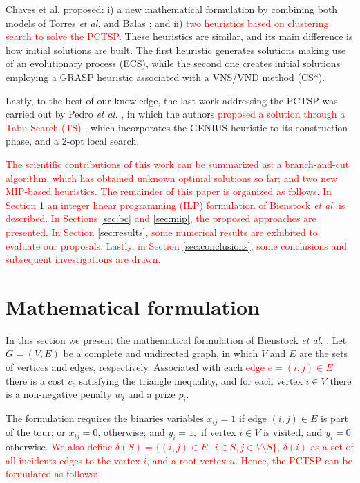\documentclass{ro}
\begin{document}
Chaves et al. \cite{chaves2005hybrid} proposed: i) a new mathematical formulation by combining both models of  Torres \textit{et al.} \cite{torres2003problemas} and Balas \cite{Balas89}; and ii)  \textcolor{red}{two heuristics   based on clustering search to solve the PCTSP}. These heuristics are  similar, and its main difference is how initial solutions are built. The first heuristic generates solutions making use of an evolutionary process (ECS), while the second one creates initial solutions employing a GRASP heuristic associated with a VNS/VND \cite{mladenovic12} method (CS*). 

Lastly, to the best of our knowledge, the last work addressing the PCTSP was carried out by Pedro \textit{et al.} \cite{pedro2013tabu}, in which the authors \textcolor{red}{proposed a solution through a Tabu Search (TS) \cite{laguna2018tabu}}, which incorporates the GENIUS \cite{genius} heuristic to its construction phase, and a 2-opt local search.

\textcolor{red}{
The  scientific contributions of this work can be summarized as: a branch-and-cut algorithm, which has obtained unknown optimal solutions so far; and two new MIP-based heuristics. The remainder of this paper is organized as follows. In Section \ref{sec:mf} an integer linear programming (ILP) formulation of Bienstock \textit{et al.}\cite{bienstock1993note} is described. In Sections \ref{sec:bc} and \ref{sec:mip}, the proposed approaches are presented. In Section \ref{sec:results}, some numerical results are exhibited to evaluate our proposals. Lastly, in Section \ref{sec:conclusions}, some conclusions and subsequent investigations are drawn.
}

\section{Mathematical formulation}
\label{sec:mf}




In this section we present the mathematical formulation of Bienstock \textit{et al.} \cite{bienstock1993note}. 
Let $G = (V, E)$ be a complete and undirected graph, in which $V$ and $E$ are the sets of vertices and edges, respectively. Associated with each \textcolor{red}{edge $e = (i, j) \in E$} there is a cost $c_e$ satisfying the triangle inequality, and for each vertex $i \in V$ there is a non-negative penalty $w_i$ and a prize $p_i$.

 The formulation requires the binaries variables $x_{ij}=1$ if edge $(i, j) \in E $
is part of the tour; or $x_{ij}=0$, otherwise; and  $y_i =  1,$ if vertex  $i \in V$ is visited, and $y_i=0$  otherwise. \textcolor{red}{We also define $\delta(S) = \{ (i,j) \in E \ | \ i \in S, j \in V \setminus S \}$, $\delta(i)$ as a set of all incidents edges to the vertex $i$, and a root vertex $u$. Hence, the PCTSP can be formulated as follows:}
\end{document}
